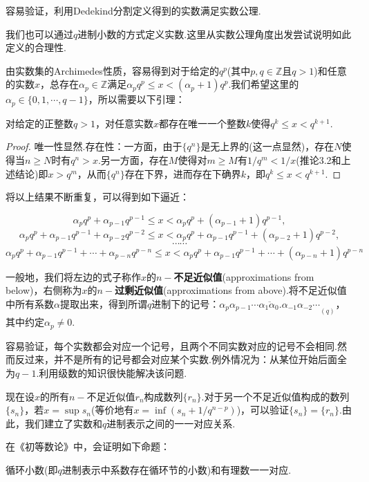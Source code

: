 \documentclass[lang=cn, zihao=5]{elegantbook}
\newcommand{\Z}{\mathbb{Z}}
\begin{document}
容易验证，利用Dedekind分割定义得到的实数满足实数公理.

我们也可以通过$q$进制小数的方式定义实数.这里从实数公理角度出发尝试说明如此定义的合理性.

由实数集的Archimedes性质，容易得到对于给定的$q^p$(其中$p,q \in \Z$且$q>1$)和任意的实数$x$，总存在$\alpha _p \in \Z$满足$\alpha _p q^p \leq x < (\alpha _p +1)q^p$.我们希望这里的$\alpha _p \in \{ 0,1,\cdots ,q-1 \}$，所以需要以下引理：

\begin{lemma}
	对给定的正整数$q>1$，对任意实数$x$都存在唯一一个整数$k$使得$q^{k} \leq x < q^{k+1}$.
\end{lemma}
\begin{proof}
	唯一性显然.存在性：一方面，由于$\{ q^n \}$是无上界的(这一点显然)，存在$N$使得当$n \geq N$时有$q^n > x$.另一方面，存在$M$使得对$m \geq M$有$1/q^m < 1/x$(推论3.2和上述结论)即$x > q^m$，从而$\{ q^n \}$存在下界，进而存在下确界$k$，即$q^k \leq x < q^{k+1}$. 
\end{proof}

将以上结果不断重复，可以得到如下逼近：

$$\alpha _p q^p + \alpha _{p-1}q^{p-1} \leq x < \alpha _p q^p + (\alpha _{p-1}+1) q^{p-1},$$
$$\alpha _p q^p + \alpha _{p-1}q^{p-1} + \alpha _{p-2}q^{p-2}  \leq x < \alpha _p q^p + \alpha _{p-1}q^{p-1} + (\alpha _{p-2}+1)q^{p-2} ,$$
$$\cdots \cdots $$
$$\alpha _p q^p + \alpha _{p-1}q^{p-1} + \cdots + \alpha _{p-n}q^{p-n}  \leq x < \alpha _p q^p + \alpha _{p-1}q^{p-1} + \cdots + (\alpha _{p-n}+1)q^{p-n}$$

一般地，我们将左边的式子称作$x$的$n-$\textbf{不足近似值}(approximations from below)，右侧称为$x$的$n-$\textbf{过剩近似值}(approximations from above).将不足近似值中所有系数$\alpha$提取出来，得到所谓$q$进制下的记号：$\overline{\alpha_p \alpha_{p-1} \cdots \alpha_1 \alpha _0 . \alpha_{-1}\alpha_{-2} \cdots}_{(q)}$，其中约定$\alpha_p \neq 0$.

容易验证，每个实数都会对应一个记号，且两个不同实数对应的记号不会相同.然而反过来，并不是所有的记号都会对应某个实数.例外情况为：从某位开始后面全为$q-1$.利用级数的知识很快能解决该问题.

现在设$x$的所有$n-$不足近似值$r_n$构成数列$\{ r_n \}$.对于另一个不足近似值构成的数列$\{ s_n \}$，若$x=\sup s_n$(等价地有$x=\inf (s_n+1/q^{n-p})$)，可以验证$\{ s_n \}=\{ r_n \}$.由此，我们建立了实数和$q$进制表示之间的一一对应关系.

在《初等数论》中，会证明如下命题：

\begin{proposition}
	循环小数(即$q$进制表示中系数存在循环节的小数)和有理数一一对应.
\end{proposition}
\end{document}
